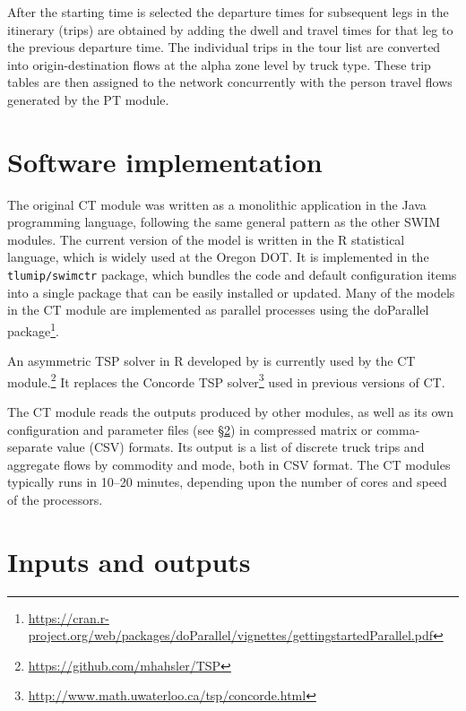 After the starting time is selected the departure times for subsequent legs in the itinerary (trips) are obtained by adding the dwell and travel times for that leg to the previous departure time. The individual trips in the tour list are converted into origin-destination flows at the alpha zone level by truck type. These trip tables are then assigned to the network concurrently with the person travel flows generated by the PT module.


\section{Software implementation}

The original CT module was written as a monolithic application in the Java programming language, following the same general pattern as the other SWIM modules. The current version of the model is written in the R statistical language, which is widely used at the Oregon DOT. It is implemented in the \verb|tlumip/swimctr| package, which bundles the code and default configuration items into a single package that can be easily installed or updated. Many of the models in the CT module are implemented as parallel processes using the doParallel package\footnote{\url{https://cran.r-project.org/web/packages/doParallel/vignettes/gettingstartedParallel.pdf}}.

An asymmetric TSP solver in R developed by \cite{hahsler07} is currently used by the CT module.\footnote{\url{https://github.com/mhahsler/TSP}} It replaces the Concorde TSP solver\footnote{\url{http://www.math.uwaterloo.ca/tsp/concorde.html}} used in previous versions of CT. 

The CT module reads the outputs produced by other modules, as well as its own configuration and parameter files (see \S\ref{sec:ct-input-output}) in compressed matrix or comma-separate value (CSV) formats. Its output is a list of discrete truck trips and aggregate flows by commodity and mode, both in CSV format. The CT modules typically runs in 10--20 minutes, depending upon the number of cores and speed of the processors. 

\section{Inputs and outputs}\label{sec:ct-input-output}

